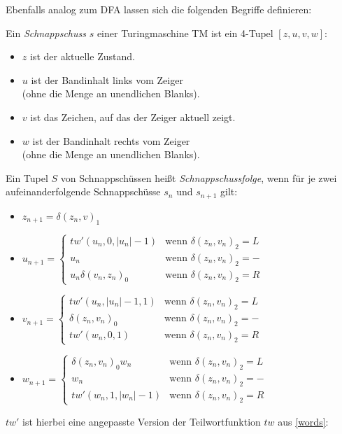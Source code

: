 Ebenfalls analog zum DFA lassen sich die folgenden Begriffe definieren:

Ein \emph{Schnappschuss} $s$ einer Turingmaschine TM ist ein 4-Tupel $[z,u,v,w]$:
\begin{itemize}
    \item $z$ ist der aktuelle Zustand.
    \item $u$ ist der Bandinhalt links vom Zeiger\\(ohne die Menge an unendlichen Blanks).
    \item $v$ ist das Zeichen, auf das der Zeiger aktuell zeigt.
    \item $w$ ist der Bandinhalt rechts vom Zeiger\\(ohne die Menge an unendlichen Blanks).
\end{itemize}
Ein Tupel $S$ von Schnappschüssen heißt \emph{Schnappschussfolge},
wenn für je zwei aufeinanderfolgende Schnappschüsse $s_n$ und $s_{n+1}$ gilt:
\begin{itemize}
    \item $z_{n+1} = \delta(z_n, v)_1$
    \item $u_{n+1} = \begin{cases}
            tw'(u_n, 0, |u_n|-1) & \text{wenn } \delta(z_n, v_n)_2 = L\\
            u_n                  & \text{wenn } \delta(z_n, v_n)_2 = -\\
            u_n\delta(v_n,z_n)_0 & \text{wenn } \delta(z_n, v_n)_2 = R
        \end{cases}$
    \item $v_{n+1} = \begin{cases}
            tw'(u_n, |u_n|-1, 1) & \text{wenn } \delta(z_n, v_n)_2 = L\\
            \delta(z_n, v_n)_0   & \text{wenn } \delta(z_n, v_n)_2 = -\\
            tw'(w_n, 0, 1)       & \text{wenn } \delta(z_n, v_n)_2 = R
        \end{cases}$
    \item $w_{n+1} = \begin{cases}
            \delta(z_n, v_n)_0w_n & \text{wenn } \delta(z_n, v_n)_2 = L\\
            w_n                  & \text{wenn } \delta(z_n, v_n)_2 = -\\
            tw'(w_n, 1, |w_n|-1) & \text{wenn } \delta(z_n, v_n)_2 = R
        \end{cases}$
\end{itemize}
\noindent
$tw'$ ist hierbei eine angepasste Version der Teilwortfunktion $tw$ aus \autoref{words}:

